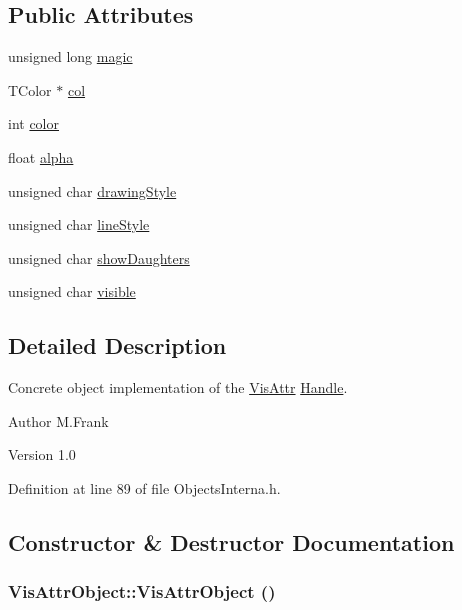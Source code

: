 \subsection*{Public Attributes}
\begin{DoxyCompactItemize}
\item 
unsigned long \hyperlink{class_d_d4hep_1_1_geometry_1_1_vis_attr_object_ab8370d8a18bf092a48bde486479bbdff}{magic}
\item 
TColor $\ast$ \hyperlink{class_d_d4hep_1_1_geometry_1_1_vis_attr_object_a5ac12c903f90e8cf16eb04ba55568f38}{col}
\item 
int \hyperlink{class_d_d4hep_1_1_geometry_1_1_vis_attr_object_a1bff0c73a37bb6791006a4f0761d9f3a}{color}
\item 
float \hyperlink{class_d_d4hep_1_1_geometry_1_1_vis_attr_object_a9a5d2ab42c03b32cb5f69294881ac756}{alpha}
\item 
unsigned char \hyperlink{class_d_d4hep_1_1_geometry_1_1_vis_attr_object_ac6a253b99e112880c1ef727f9b9f9e73}{drawingStyle}
\item 
unsigned char \hyperlink{class_d_d4hep_1_1_geometry_1_1_vis_attr_object_aaede923ed352bb5f43a809f6943f2061}{lineStyle}
\item 
unsigned char \hyperlink{class_d_d4hep_1_1_geometry_1_1_vis_attr_object_a7fc2c6d4195f0c8524315272a81436e6}{showDaughters}
\item 
unsigned char \hyperlink{class_d_d4hep_1_1_geometry_1_1_vis_attr_object_a316d66f51e43f6601839b271072a4765}{visible}
\end{DoxyCompactItemize}


\subsection{Detailed Description}
Concrete object implementation of the \hyperlink{class_d_d4hep_1_1_geometry_1_1_vis_attr}{VisAttr} \hyperlink{class_d_d4hep_1_1_handle}{Handle}. \begin{DoxyAuthor}{Author}
M.Frank 
\end{DoxyAuthor}
\begin{DoxyVersion}{Version}
1.0 
\end{DoxyVersion}


Definition at line 89 of file ObjectsInterna.h.

\subsection{Constructor \& Destructor Documentation}
\hypertarget{class_d_d4hep_1_1_geometry_1_1_vis_attr_object_ae88bf67cabcbfd4582037897a05f25bb}{
\subsubsection[{VisAttrObject}]{\setlength{\rightskip}{0pt plus 5cm}VisAttrObject::VisAttrObject ()}}
\label{class_d_d4hep_1_1_geometry_1_1_vis_attr_object_ae88bf67cabcbfd4582037897a05f25bb}


